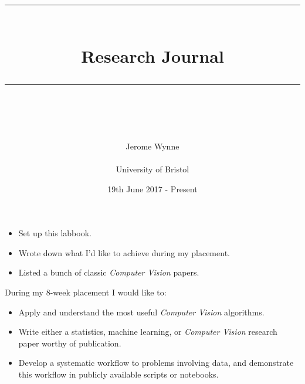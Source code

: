 \documentclass[idxtotoc,hyperref,openany]{labbook} %
\newcommand{\HRule}{\rule{\linewidth}{0.5mm}} %
\begin{document}

\frontmatter %
\title{
\begin{center}
\HRule \\[0.4cm]
{\Huge \bfseries Research Journal}\\
\HRule \\[1.5cm]
\end{center}
}
\author{\Huge Jerome Wynne \\ \\ \LARGE University of Bristol \\[2cm]}
\date{19th June 2017 - Present}
\maketitle

\tableofcontents

\mainmatter










\begin{itemize}
	\item Set up this labbook.
	\item Wrote down what I'd like to achieve during my placement.
	\item Listed a bunch of classic \emph{Computer Vision} papers.
\end{itemize}

During my 8-week placement I would like to:
\begin{itemize}
	\item Apply and understand the most useful \emph{Computer Vision} algorithms.
	\item Write either a statistics, machine learning, or \emph{Computer Vision} research paper worthy of publication.
	\item Develop a systematic workflow to problems involving data, and demonstrate this workflow in publicly available scripts or notebooks.
\end{itemize}
\end{document}
